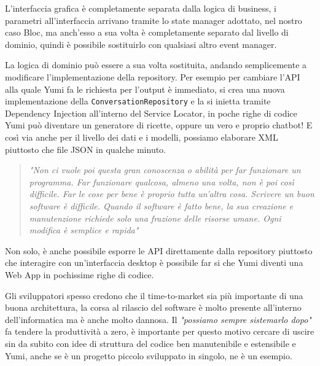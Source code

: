 L'interfaccia grafica è completamente separata dalla logica di business, i parametri all'interfaccia arrivano tramite lo state manager adottato, nel nostro caso Bloc, ma anch'esso a sua volta è completamente separato dal livello di dominio, quindi è possibile sostituirlo con qualsiasi altro event manager. 

La logica di dominio può essere a sua volta sostituita, andando semplicemente a modificare l'implementazione della repository. Per esempio per cambiare l'API alla quale Yumi fa le richiesta per l'output è immediato, si crea una nuova implementazione della \texttt{ConversationRepository} e la si inietta tramite Dependency Injection all'interno del Service Locator, in poche righe di codice Yumi può diventare un generatore di ricette, oppure un vero e proprio chatbot! E così via anche per il livello dei dati e i modelli, possiamo elaborare XML piuttosto che file JSON in qualche minuto.

\begin{quotation}\small{}
\textit{"Non ci vuole poi questa gran conoscenza o abilità per far funzionare un programma. Far funzionare qualcosa, almeno una volta, non è poi così difficile. Far le cose per bene è proprio tutta un'altra cosa. Scrivere un buon software è difficile. Quando il software è fatto bene, la sua creazione e manutenzione richiede solo una frazione delle risorse umane. Ogni modifica è semplice e rapida"}\cite{10.5555/3175742}
\end{quotation}

Non solo, è anche possibile esporre le API direttamente dalla repository piuttosto che interagire con un'interfaccia desktop è possibile far si che Yumi diventi una Web App in pochissime righe di codice. 

Gli sviluppatori spesso credono che il time-to-market sia più importante di una buona architettura, la corsa al rilascio del software è molto presente all'interno dell'informatica ma è anche molto dannosa. Il \textit{"possiamo sempre sistemarlo dopo"} fa tendere la produttività a zero, è importante per questo motivo cercare di uscire sin da subito con idee di struttura del codice ben manutenibile e estensibile e Yumi, anche se è un progetto piccolo sviluppato in singolo, ne è un esempio.